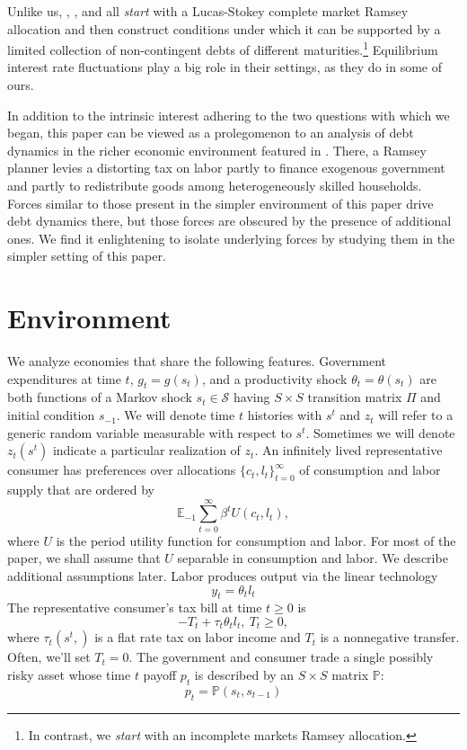 \documentclass[12pt]{article}
\begin{document}
 Unlike us, \citet{Angeletos}, \citet{Buera_Nicolini}, and \citet{Shin2007} all  {\em start} with a Lucas-Stokey complete market
Ramsey allocation
and then construct conditions under which it  can be supported by  a limited  collection of non-contingent debts of different maturities.\footnote{In contrast,
we {\em start} with an incomplete markets Ramsey allocation.}
Equilibrium interest rate fluctuations
play a big role in their settings, as they do in some of ours.

In addition to the intrinsic interest adhering to the two questions with which we began, this paper can be viewed as
a prolegomenon to an analysis of debt dynamics in the richer   economic environment featured in \citet{BEGS1}.  There,
a Ramsey planner levies a distorting tax on labor partly to finance exogenous government  and partly to redistribute goods among heterogeneously skilled households.
Forces similar to those present in the simpler environment of this paper drive debt dynamics there,  but those forces are obscured by the presence of
additional ones.  We find it enlightening to isolate underlying forces by studying them in the  simpler setting of this paper.

\section{Environment}



We analyze economies that share the following features.
Government expenditures at time $t$, $g_t=g(s_t)$, and a productivity shock $\theta_t=\theta(s_t)$ are both functions of
  a Markov  shock $s_t\in \mathcal{S}$ having  $S \times S$ transition matrix $\Pi$ and initial condition $s_{-1}$. We will denote time $t$ histories with $s^t$ and $z_t$ will refer to a generic random variable measurable with respect to $s^t$. Sometimes we will denote $z_t(s^t)$ indicate a particular realization of $z_t$.
 An infinitely lived representative consumer has preferences over allocations  $\{c_t, l_t\}_{t=0}^\infty$ of consumption and labor supply that are ordered
by
   \begin{equation}
   \label{eqn:obj}
\mathbb{E}_{-1}\sum_{t=0}^{\infty } \beta^t  U\left(
c_t,l_t\right),
\end{equation}%
where $U$ is the period utility function for consumption and labor.  For most of the paper,  we shall assume that $U$ separable in consumption and labor.  We describe additional assumptions later.  Labor produces output via the linear technology
  \begin{equation*}
  y_t=\theta_{t} l_{t} \end{equation*}
The representative consumer's tax bill
 at time $t \geq 0$ is
 \[- T_t + \tau_t \theta_{t}l_{t},  \ T_t \geq 0, \]
 where $\tau_t(s^t,)$ is a flat rate tax on labor income and $T_t$ is a nonnegative transfer.
 Often, we'll set $T_t =0$.
The government and consumer trade a single  possibly risky  asset whose  time $t$ payoff $p_t$ is described by an $S \times S$ matrix $\mathbb{P}$:
\[p_t=\mathbb{P}(s_{t},s_{t-1}) \]
\end{document}

